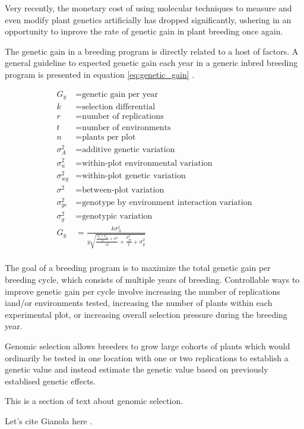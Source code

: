 Very recently, the monetary cost of using molecular techniques to measure and even modify plant
genetics artificially has dropped significantly, ushering in an opportunity to inprove 
the rate of genetic gain in plant breeding once again.

The genetic gain in a breeding program is directly related to a host of factors. A 
general guideline to expected genetic gain each year in a generic inbred breeding 
program is presented in equation \ref{eq:genetic_gain} \citep{fehr1987}.

\begin{equation} \label{eq:genetic_gain}
\begin{split}
    G_y           &= \textrm{genetic gain per year} \\
    k             &= \textrm{selection differential} \\
    r             &= \textrm{number of replications} \\
    t             &= \textrm{number of environments} \\
    n             &= \textrm{plants per plot} \\
    \sigma^2_{A}  &= \textrm{additive genetic variation} \\
    \sigma^2_{u}  &= \textrm{within-plot environmental variation} \\
    \sigma^2_{wg} &= \textrm{within-plot genetic variation} \\
    \sigma^2      &= \textrm{between-plot variation} \\
    \sigma^2_{ge} &= \textrm{genotype by environment interaction variation} \\
    \sigma^2_{g}  &= \textrm{genotypic variation} \\
    G_y           &= \frac{k\sigma^2_A}{y \sqrt{ \frac{\frac{\sigma^2_{u} + \sigma^2_{wg}}{n} + \sigma^2}{rt} + \frac{\sigma^2_{ge}}{t} + \sigma^2_{g} }} \\
\end{split}
\end{equation}

The goal of a breeding program is to maximize the total genetic gain per breeding cycle, 
which consists of multiple years of breeding. Controllable ways to improve genetic gain 
per cycle involve increasing the number of replications iand/or environments tested,
increasing the number of plants within each experimental plot, or increasing overall selection pressure
during the breeding year.

Genomic selection allows breeders to grow large cohorts of plants which would ordinarily be 
tested in one location with one or two replications to establish a genetic value and instead 
estimate the genetic value based on previously establised genetic effects. 


This is a section of text about genomic selection. 

Let's cite Gianola here \citep{gianola2006}.

\blindtext


\blindenumerate
\blindtext

